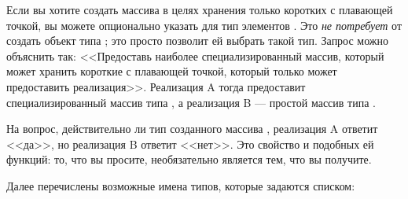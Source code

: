 Если вы хотите создать массива в целях хранения только коротких с плавающей
точкой, вы можете опционально указать для  тип элементов
. Это \emph{не потребует} от  создать объект типа
; это просто позволит ей выбрать такой тип. Запрос
можно объяснить так: <<Предоставь наиболее специализированный массив, который
может хранить короткие с плавающей точкой, который только может предоставить
реализация>>. Реализация A тогда предоставит специализированный массив типа
, а реализация B --- простой массив типа .

На вопрос, действительно ли тип созданного массива ,
реализация A ответит <<да>>, но реализация B ответит <<нет>>. Это свойство
 и подобных ей функций: то, что вы просите, необязательно
является тем, что вы получите.

Далее перечислены возможные имена типов, которые задаются списком:

